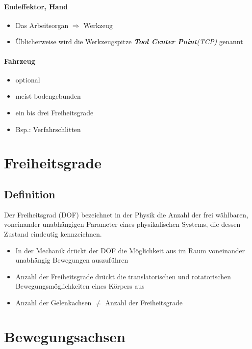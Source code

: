 \paragraph{Endeffektor, Hand}
\begin{itemize}
	\item Das Arbeitsorgan $\Rightarrow$ Werkzeug
	\item Üblicherweise wird die Werkzeugspitze \textit{\textbf{Tool Center Point}(TCP)} genannt
\end{itemize}
\paragraph{Fahrzeug}
\begin{itemize}
	\item optional
	\item meist bodengebunden
	\item ein bis drei Freiheitsgrade
	\item Bsp.: Verfahrschlitten
\end{itemize}
\section{Freiheitsgrade}
\subsection{Definition}
Der Freiheitsgrad (DOF) bezeichnet in der Physik die Anzahl der frei wählbaren, voneinander unabhängigen Parameter eines physikalischen Systems, die dessen Zustand eindeutig kennzeichnen.
\begin{itemize}
	\item In der Mechanik drückt der DOF die Möglichkeit aus im Raum voneinander unabhängig Bewegungen auszuführen
	\item Anzahl der Freiheitsgrade drückt die translatorischen und rotatorischen Bewegungsmöglichkeiten eines Körpers aus
	\item Anzahl der Gelenkachsen $\neq$ Anzahl der Freiheitsgrade
\end{itemize}
\section{Bewegungsachsen}
